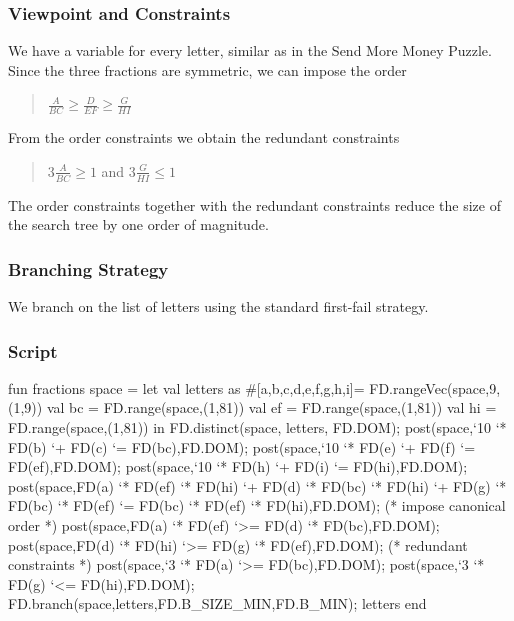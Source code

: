 \documentclass[a4paper]{scrartcl}
\begin{document}
\subsubsection{Viewpoint and Constraints}
We have a variable for every letter, similar as 
in the Send More Money Puzzle. Since the three fractions 
are symmetric, we can impose the order 
\begin{quote}
$ \frac{A}{BC} \ge  \frac{D}{EF} \ge  \frac{G}{HI} $
\end{quote}
From the order constraints we obtain the redundant 
constraints 
\begin{quote}
$ 3\frac{A}{BC} \ge 1 $ and $3\frac{G}{HI} \le 1 $
\end{quote}
The order constraints together with the redundant 
constraints reduce the size of the search tree by one order 
of magnitude. 

\subsubsection{Branching Strategy}
We branch on the list of letters using the standard 
first-fail strategy.

\subsubsection{Script}
\begin{myverbatim}
fun fractions space =
        let 
            val letters as #[a,b,c,d,e,f,g,h,i]=
                FD.rangeVec(space,9,(1,9))
            val bc = FD.range(space,(1,81))
            val ef = FD.range(space,(1,81))
            val hi = FD.range(space,(1,81))
        in
            FD.distinct(space, letters, FD.DOM);
            post(space,`10 `* FD(b) `+ FD(c) `= FD(bc),FD.DOM);
            post(space,`10 `* FD(e) `+ FD(f) `= FD(ef),FD.DOM);
            post(space,`10 `* FD(h) `+ FD(i) `= FD(hi),FD.DOM);   
            post(space,FD(a) `* FD(ef) `* FD(hi) `+
                       FD(d) `* FD(bc) `* FD(hi) `+
                       FD(g) `* FD(bc) `* FD(ef) `= 
                       FD(bc) `* FD(ef) `* FD(hi),FD.DOM);
            (* impose canonical order *)
            post(space,FD(a) `* FD(ef) `>= FD(d) `* FD(bc),FD.DOM);
            post(space,FD(d) `* FD(hi) `>= FD(g) `* FD(ef),FD.DOM);
            (* redundant constraints *)
            post(space,`3 `* FD(a) `>= FD(bc),FD.DOM);
            post(space,`3 `* FD(g) `<= FD(hi),FD.DOM);
            FD.branch(space,letters,FD.B_SIZE_MIN,FD.B_MIN);
            {letters}  
       end     
\end{myverbatim}
\end{document}
